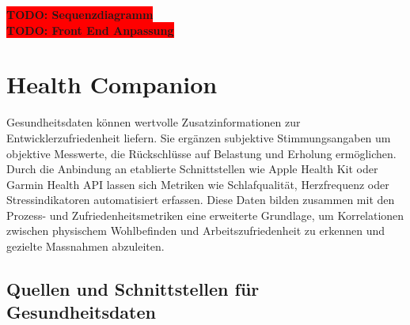 \documentclass[12pt,a4paper]{report}
\newcommand{\todo}[1]{\colorbox{red}{\textbf{TODO: #1}}\\}
\begin{document}
\todo{Sequenzdiagramm}
\todo{Front End Anpassung}

%


\section{Health Companion}

Gesundheitsdaten können wertvolle Zusatzinformationen zur Entwicklerzufriedenheit liefern. Sie ergänzen subjektive Stimmungsangaben
um objektive Messwerte, die Rückschlüsse auf Belastung und Erholung ermöglichen. Durch die Anbindung an etablierte Schnittstellen
wie Apple Health Kit oder Garmin Health API lassen sich Metriken wie Schlafqualität, Herzfrequenz oder Stressindikatoren
automatisiert erfassen. Diese Daten bilden zusammen mit den Prozess- und Zufriedenheitsmetriken eine erweiterte Grundlage, um
Korrelationen zwischen physischem Wohlbefinden und Arbeitszufriedenheit zu erkennen und gezielte Massnahmen abzuleiten.

\subsection{Quellen und Schnittstellen für Gesundheitsdaten}
\end{document}
